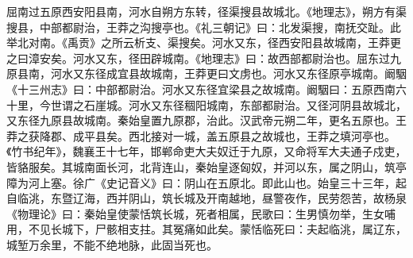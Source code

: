 \documentclass[12pt,UTF8]{ctexbook}
\begin{document}
屈南过五原西安阳县南，河水自朔方东转，径渠搜县故城北。《地理志》，朔方有渠搜县，中部都尉治，王莽之沟搜亭也。《礼三朝记》曰：北发渠搜，南抚交趾。此举北对南。《禹贡》之所云析支、渠搜矣。河水又东，径西安阳县故城南，王莽更之曰漳安矣。河水又东，径田辟城南。《地理志》曰：故西部都尉治也。屈东过九原县南，河水又东径成宜县故城南，王莽更曰文虏也。河水又东径原亭城南。阚駰《十三州志》曰：中部都尉治。河水又东径宜梁县之故城南。阚駰曰：五原西南六十里，今世谓之石崖城。河水又东径稒阳城南，东部都尉治。又径河阴县故城北，又东径九原县故城南。秦始皇置九原郡，治此。汉武帝元朔二年，更名五原也。王莽之获降郡、成平县矣。西北接对一城，盖五原县之故城也，王莽之填河亭也。《竹书纪年》，魏襄王十七年，邯郸命吏大夫奴迁于九原，又命将军大夫通子戍吏，皆貉服矣。其城南面长河，北背连山，秦始皇逐匈奴，并河以东，属之阴山，筑亭障为河上塞。徐广《史记音义》曰：阴山在五原北。即此山也。始皇三十三年，起自临洮，东暨辽海，西并阴山，筑长城及开南越地，昼警夜作，民劳怨苦，故杨泉《物理论》曰：秦始皇使蒙恬筑长城，死者相属，民歌曰：生男慎勿举，生女哺用，不见长城下，尸骸相支拄。其冤痛如此矣。蒙恬临死曰：夫起临洮，属辽东，城堑万余里，不能不绝地脉，此固当死也。
\end{document}
